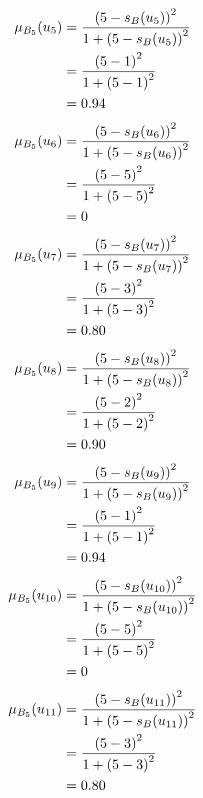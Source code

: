 \documentclass[a4paper,openany]{book}
\begin{document}
				\begin{align}
					\mu_{B_5}(u_5) &= \frac{\left(5-s_B(u_5)\right)^2}{1 + \left(5-s_B(u_5)\right)^2}\\
					&= \frac{\left(5-1\right)^2}{1 + \left(5-1\right)^2} \notag \\
					&= 0.94 \notag
				\end{align}
				\begin{align}
					\mu_{B_5}(u_6) &= \frac{\left(5-s_B(u_6)\right)^2}{1 + \left(5-s_B(u_6)\right)^2}\\
					&= \frac{\left(5-5\right)^2}{1 + \left(5-5\right)^2} \notag \\
					&= 0 \notag
				\end{align}
				\begin{align}
					\mu_{B_5}(u_7) &= \frac{\left(5-s_B(u_7)\right)^2}{1 + \left(5-s_B(u_7)\right)^2}\\
					&= \frac{\left(5-3\right)^2}{1 + \left(5-3\right)^2} \notag \\
					&= 0.80 \notag
				\end{align}
				\begin{align}
					\mu_{B_5}(u_8) &= \frac{\left(5-s_B(u_8)\right)^2}{1 + \left(5-s_B(u_8)\right)^2}\\
					&= \frac{\left(5-2\right)^2}{1 + \left(5-2\right)^2} \notag \\
					&= 0.90 \notag
				\end{align}
				\begin{align}
					\mu_{B_5}(u_9) &= \frac{\left(5-s_B(u_9)\right)^2}{1 + \left(5-s_B(u_9)\right)^2}\\
					&= \frac{\left(5-1\right)^2}{1 + \left(5-1\right)^2} \notag \\
					&= 0.94 \notag
				\end{align}
				\begin{align}
					\mu_{B_5}(u_{10}) &= \frac{\left(5-s_B(u_{10})\right)^2}{1 + \left(5-s_B(u_{10})\right)^2}\\
					&= \frac{\left(5-5\right)^2}{1 + \left(5-5\right)^2} \notag \\
					&= 0 \notag
				\end{align}
				\begin{align}
					\mu_{B_5}(u_{11}) &= \frac{\left(5-s_B(u_{11})\right)^2}{1 + \left(5-s_B(u_{11})\right)^2}\\
					&= \frac{\left(5-3\right)^2}{1 + \left(5-3\right)^2} \notag \\
					&= 0.80 \notag
				\end{align}
\end{document}
